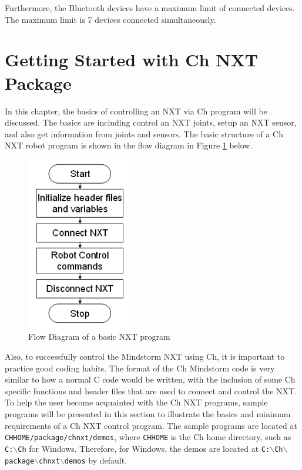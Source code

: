 \documentclass[11pt]{article}
\begin{document}
Furthermore, the Bluetooth devices have a maximum limit of connected devices. The maximum limit is 7 devices connected 
simultaneously.

\newpage
\section{Getting Started with Ch NXT Package}
In this chapter, the basics of controlling an NXT via Ch program will be discussed. The basics are including
control an NXT joints, setup an NXT sensor, and also get information from joints and sensors. The basic structure 
of a Ch NXT robot program is shown in the flow diagram in Figure \ref{fig_NXT_pstruc} below.\\

\begin{figure}[h!]
  \begin{center}
    \includegraphics[height=3in]{figure/mindstorm/NXT_pstruc.png}
    \caption{Flow Diagram of a basic NXT program\label{fig_NXT_pstruc}}
  \end{center}
\end{figure}

\noindent
Also, to successfully control the Mindstorm NXT using Ch, it is important to practice good coding habits. 
The format of the Ch Mindstorm code is very similar to how a normal C code would be written, with the
inclusion of some Ch specific functions and header files that are used to connect and control the NXT. To 
help the user become acquainted with the Ch NXT programs, sample programs will be presented in this 
section to illustrate the basics and minimum requirements of a Ch NXT control program. The sample programs
are located at \texttt{CHHOME/package/chnxt/demos}, where \texttt{CHHOME} is the Ch home directory, such as
\texttt{C:$\backslash$Ch} for Windows. Therefore, for Windows, the demos are located at 
\texttt{C:$\backslash$Ch$\backslash$package$\backslash$chnxt$\backslash$demos} by default.
\end{document}
